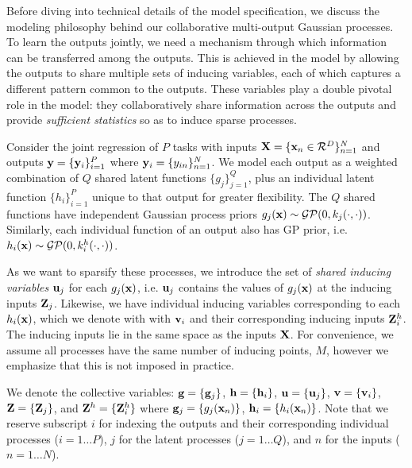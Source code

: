 Before diving into technical details of the model specification, 
we discuss the modeling philosophy behind our collaborative multi-output Gaussian processes.
To learn the outputs jointly, we need a mechanism through which information can be transferred among the outputs.
This is achieved in the model by allowing the outputs to share multiple sets of inducing variables, 
each of which captures a different pattern common to the outputs.
These variables  play a double pivotal role in the model: they collaboratively share  information 
across the outputs and  provide \emph{sufficient statistics}  so as to induce sparse processes. 

\newcommand{\Zj}{\Z_j}
\newcommand{\Zhi}{\Z^h_i}
Consider the joint regression of $P$ tasks with inputs $\mathbf{X} = \{\mathbf{x}_n \in \mathcal{R}^D\}_{n=1}^N$ and outputs $\mathbf{y} = \{\mathbf{y}_i\}_{i=1}^P$ where $\mathbf{y}_i = \{y_{in}\}_{n=1}^N$.
We  model each output as a weighted combination of $Q$ shared latent functions $\{ g_{j}\}_{j=1}^{Q}$, plus an individual latent 
function $\{ h_{i}\}_{i=1}^{P}$ unique to that output for greater flexibility.
The $Q$ shared functions have independent Gaussian process priors  $g_j(\mathbf{x}) \sim \mathcal{GP}(0, k_j(\cdot,\cdot))$. %
Similarly, each individual function of an output also has GP prior, i.e.~$h_i(\mathbf{x}) \sim \mathcal{GP}(0, k^h_i(\cdot,\cdot))$. %


As we want to sparsify these processes, 
we introduce the set of \emph{shared inducing variables} $\mathbf{u}_j$ for  each $g_j(\mathbf{x})$, i.e. $\mathbf{u}_j$ contains the values of 
$g_j(\mathbf{x})$ at the inducing inputs $\mathbf{Z}_j$. Likewise, we have 
individual inducing variables corresponding to each  $h_i(\mathbf{x})$,  which we denote with with $\mathbf{v}_i$ and their 
corresponding inducing inputs $\Zhi$.
%
The inducing inputs lie in the same space as the inputs $\mathbf{X}$.
For convenience, we  assume all processes have the same number of inducing points, $M$, however we emphasize that this is not
 imposed in practice.


We denote the collective variables: $\mathbf{g} = \{\mathbf{g}_j\}$, $\mathbf{h} = \{\mathbf{h}_i \}$, $\mathbf{u} = \{\mathbf{u}_j\}$, $\mathbf{v} = \{\mathbf{v}_i\}$, $\Z = \{\Zj\}$, and $\Z^h = \{\Zhi \}$ where $\mathbf{g}_j = \{g_j(\mathbf{x}_n)\}$, $\mathbf{h}_i = \{h_i(\mathbf{x}_n)\}$. 
Note that we reserve subscript $i$ for indexing the outputs and their corresponding individual processes ($i = 1 \hdots P$), $j$ for the latent processes ($j = 1 \hdots Q$), and $n$ for the inputs ($n = 1 \hdots N$).
%
